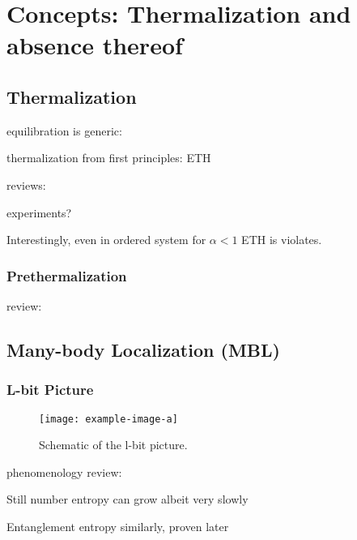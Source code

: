 \chapter{Concepts: Thermalization and absence thereof}\label{ch:another}
\section{Thermalization}
equilibration is generic: \cite{reimannFoundationStatisticalMechanics2008,lindenQuantumMechanicalEvolution2009}

thermalization from first principles: ETH \cite{deutschQuantumStatisticalMechanics1991,srednickiChaosQuantumThermalization1994,rigolThermalizationItsMechanism2008}

reviews: \cite{gogolinEquilibrationThermalisationEmergence2016,dalessioQuantumChaosEigenstate2016,deutschEigenstateThermalizationHypothesis2018,moriThermalizationPrethermalizationIsolated2018}

experiments?

Interestingly, even in ordered system for $\alpha<1$ ETH is violates\cite{sugimotoEigenstateThermalizationLongRange2022}.


\subsection{Prethermalization}

review: \cite{moriThermalizationPrethermalizationIsolated2018}

\section{Many-body Localization (MBL)}
\subsection{L-bit Picture}

\begin{figure}[htb]
	\centering
	\texttt{[image: example-image-a]}
	\caption{Schematic of the l-bit picture.}
\end{figure}

phenomenology review: \cite{imbrieReviewLocalIntegrals2017}


Still number entropy can grow albeit very slowly\cite{kiefer-emmanouilidisEvidenceUnboundedGrowth2020,chavezUltraslowGrowthNumber2023}

Entanglement entropy similarly\cite{bardarsonUnboundedGrowthEntanglement2012}, proven later\cite{huangExtensiveEntropyUnitary2021}

